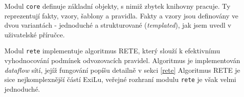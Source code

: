 Modul \verb|core| definuje základní objekty, s nimiž zbytek knihovny
pracuje.  Ty reprezentují fakty, vzory, šablony a pravidla. Fakty a vzory jsou
definovány ve dvou variantách - jednoduché a strukturované (\emph{templated}),
jak jsem uvedl v uživatelské příručce.






Modul \verb|rete| implementuje algoritmus RETE, který slouží k efektivnímu
vyhodnocování podmínek odvozovacích pravidel. Algoritmus je implementován
\emph{dataflow} sítí, jejíž fungování popíšu detailně v sekci \ref{rete}
Algoritmus RETE je sice nejkomplexnější částí ExiLu, veřejné rozhraní modulu
\verb|rete| je však velmi jednoduché.

